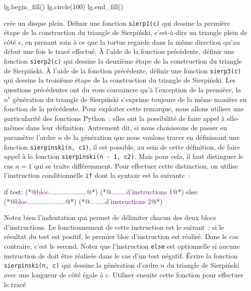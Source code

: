 \documentclass{magnoliaold}
\begin{document}
\begin{questions}
\begin{pythoncode}
lg.begin_fill()
lg.circle(100)
lg.end_fill()
\end{pythoncode}
crée un disque plein.
\question Définir une fonction \verb!sierp1(c)! qui dessine la première étape de la construction du triangle
  de Sierpi\'nski, c'est-à-dire un triangle plein de côté $c$, en prenant soin à ce que la tortue regarde dans
  la même direction qu'au début une fois le tracé effectué.
\question À l'aide de la fonction précédente, définir une fonction \verb!sierp2(c)! qui dessine la deuxième
  étape de la construction du triangle de Sierpi\'nski.
\question À l'aide de la fonction précédente, définir une fonction \verb!sierp3(c)! qui dessine la troisième
  étape de la construction du triangle de Sierpi\'nski.
\enonce Les questions précédentes ont du vous convaincre qu'à l'exception de la première, la $n^e$ génération
  du triangle de Sierpi\'nski s'exprime toujours de la même manière en fonction de la précédente. Pour exploiter
  cette remarque, nous allons utiliser une particularité des fonctions Python~: elles ont la possibilité de
  faire appel à elle-mêmes dans leur définition. Autrement dit, si nous choisissons de passer en paramètre l'ordre
  $n$ de la génération que nous voulons tracer en définissant une fonction \verb!sierpinski(n, c1)!, il est possible,
  au sein de cette définition, de faire appel à la fonction \verb!sierpinski(n - 1, c2)!. Mais pour cela, il faut
  distinguer le cas $n=1$ qui se traite différemment. Pour effectuer cette distinction, on utilise l'instruction
  conditionnelle \verb!if! dont la syntaxe est la suivante~:
\begin{pythoncode}
if test:
    (*@\textcolor{purple}{bloc....................}@*)
    (*@\textcolor{purple}{........d'instructions 1}@*)
else:
    (*@\textcolor{purple}{bloc....................}@*)
    (*@\textcolor{purple}{........d'instructions 2}@*)
\end{pythoncode}
Notez bien l'indentation qui permet de délimiter chacun des deux blocs d'instructions. Le fonctionnement de
cette instruction est le suivant~: si le résultat du test est positif, le premier bloc d'instruction est
réalisé. Dans le cas contraire, c'est le second. Notez que l'instruction \verb!else! est optionnelle si aucune
instruction de doit être réalisée dans le cas d'un test négatif. 
\question Écrire la fonction \verb!sierpinski(n, c)! qui dessine la génération d'ordre $n$ du triangle de
  Sierpi\'nski avec une longueur de côté égale à $c$. Utiliser ensuite cette fonction pour effectuer le tracé

\end{questions}
\end{document}
